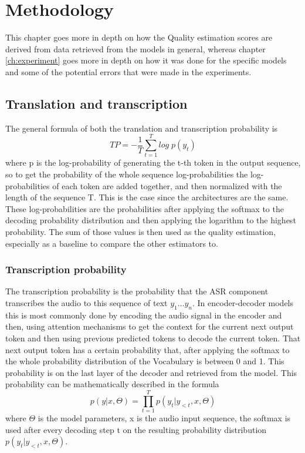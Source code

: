 
\chapter{Methodology}
\label{ch:methods}
This chapter goes more in depth on how the Quality estimation scores are derived from data retrieved from the models in general, whereas chapter \ref{ch:experiment} goes more in depth on how it was done for the specific models and some of the potential errors that were made in the experiments.

\section{Translation and transcription}
The general formula of both the translation and transcription probability is $$TP=-\frac{1}{T}\sum_{t=1}^T log\; p(y_t) \label{formula:translation Probability}$$
where p is the log-probability of generating the t-th token in the output sequence, so to get the probability of the whole sequence log-probabilities the log-probabilities of each token are added together, and then normalized with the length of the sequence T. 
This is the case since the architectures are the same.
These log-probabilities are the probabilities after applying the softmax to the decoding probability distribution and then applying the logarithm to the highest probability.
The sum of those values is then used as the quality estimation, especially as a baseline to compare the other estimators to.


\subsection{Transcription probability}
The transcription probability is the probability that the ASR component transcribes the audio to this sequence of text $y_1\dots y_n$. 
In encoder-decoder models this is most commonly done by encoding the audio signal in the encoder and then, using attention mechanisms to get the context for the current next output token and then using previous predicted tokens to decode the current token. 
That next output token has a certain probability that, after applying the softmax to the whole probability distribution of the Vocabulary is between 0 and 1. This probability is on the last layer of the decoder and retrieved from the model. 
This probability can be mathematically described in the formula $$p(y|x,\Theta)=\prod_{t=1}^T p(y_t|y_{<t}, x, \Theta) $$ where $\Theta$ is the model parameters, x is the audio input sequence, the softmax is used after every decoding step t on the resulting probability distribution $p(y_t|y_{<t}, x,\Theta)$. 

